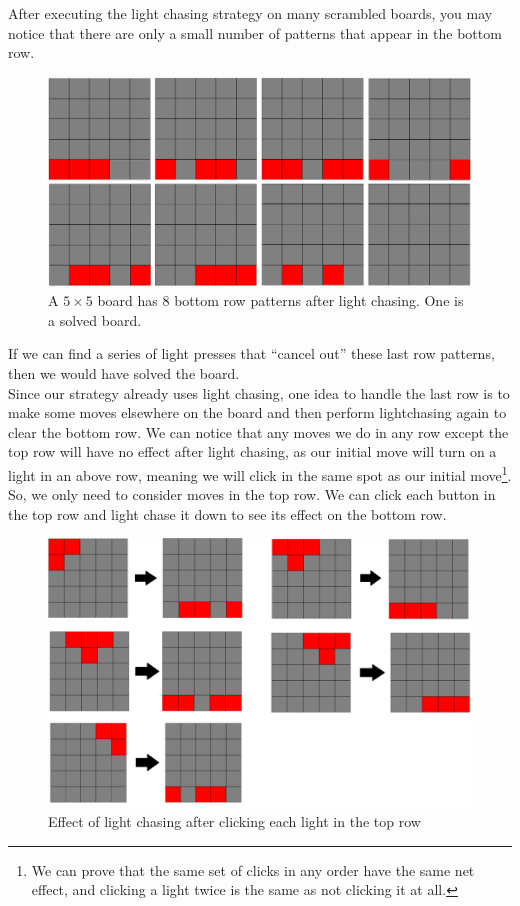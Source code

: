\documentclass[a4paper]{article}
\begin{document}
	After executing the light chasing strategy on many scrambled boards, you may notice that there are only a small number of patterns that appear in the bottom row.
	\begin{figure}[H]
		\includegraphics[width=\textwidth]{board3.png}
		\caption{A $5 \times 5$ board has 8 bottom row patterns after light chasing. One is a solved board.}
	\end{figure}
	If we can find a series of light presses that ``cancel out'' these last row patterns, then we would have solved the board. \\
	
	Since our strategy already uses light chasing, one idea to handle the last row is to make some moves elsewhere on the board and then perform lightchasing again to clear the bottom row.
	We can notice that any moves we do in any row except the top row will have no effect after light chasing, as our initial move will turn on a light in an above row, meaning we will click in the same spot as our initial move\footnote{We can prove that the same set of clicks in any order have the same net effect, and clicking a light twice is the same as not clicking it at all.}.
	So, we only need to consider moves in the top row.
	We can click each button in the top row and light chase it down to see its effect on the bottom row.
	
	\begin{figure}[H]
		\includegraphics[width=\textwidth]{board4.png}
		\caption{Effect of light chasing after clicking each light in the top row}
	\end{figure}
\end{document}
